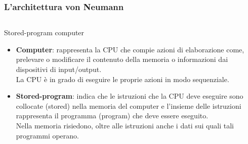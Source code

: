 \begin{frame}
	\frametitle{L'architettura von Neumann}
	
	
	\begin{columns}			
		\begin{block}{Stored-program computer}
			\begin{itemize}
				\item \textbf{Computer}: 
					rappresenta la CPU che compie azioni di elaborazione come, prelevare o modificare il contenuto della memoria o informazioni dai dispositivi di input/output.\\
					La CPU è in grado di eseguire le proprie azioni in modo sequenziale.
				\item \textbf{Stored-program}: indica che le istruzioni che la CPU deve eseguire sono collocate (stored) nella memoria del computer e l'insieme delle istruzioni rappresenta il programma (program) che deve essere eseguito.\\Nella memoria risiedono, oltre alle istruzioni anche i dati sui quali tali programmi operano.
			\end{itemize}
		\end{block}
		

\end{columns}
\end{frame}
